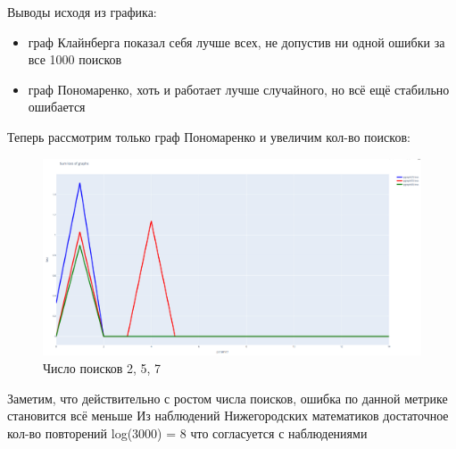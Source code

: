 Выводы исходя из графика:

\begin{itemize}
    \item граф Клайнберга показал себя лучше всех, не допустив ни одной ошибки за все 1000 поисков
    \item граф Пономаренко, хоть и работает лучше случайного, но всё ещё стабильно ошибается
\end{itemize}

Теперь рассмотрим только граф Пономаренко и увеличим кол-во поисков:
\begin{figure}[H]
    \centering
    \includegraphics[scale=0.25]{./pictures/sum_loss_Ponomarenko.png}
    \caption{Число поисков 2, 5, 7} \label{sum_loss_Ponomarenko}
\end{figure}

Заметим, что действительно с ростом числа поисков, ошибка по данной метрике становится всё меньше
Из наблюдений Нижегородских математиков достаточное кол-во повторений log(3000) = 8
что согласуется с наблюдениями


